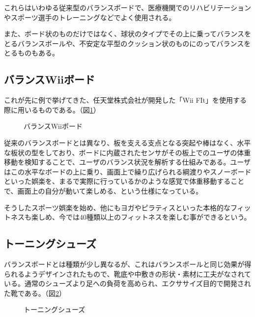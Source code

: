 これらはいわゆる従来型のバランスボードで、医療機関でのリハビリテーションやスポーツ選手のトレーニングなどでよく使用される。

また、ボード状のものだけではなく、球状のタイプでその上に乗ってバランスをとるバランスボールや、不安定な平型のクッション状のものにのってバランスをとるものもある。


\subsection{バランスWiiボード}

これが先に例で挙げてきた、任天堂株式会社が開発した「Wii FIt」を使用する際に用いるものである。（図\ref{fig:03}）


\begin{figure}[htbp]
    \begin{center}
    \end{center}
    \caption{バランスWiiボード}
    \label{fig:03}
\end{figure}



従来のバランスボードとは異なり、板を支える支点となる突起や棒はなく、水平な板状の型をしており、ボードに内蔵されたセンサがその板上でのユーザの体重移動を検知することで、ユーザのバランス状況を解析する仕組みである。ユーザはこの水平なボードの上に乗り、画面上で繰り広げられる綱渡りやスノーボードといった娯楽を、まるで実際に行っているかのような感覚で体重移動することで、画面上の自分が動いて楽しめる、という仕様になっている。

そうしたスポーツ娯楽を始め、他にもヨガやピラティスといった本格的なフィットネスも楽しめ、今では40種類以上のフィットネスを楽しむ事ができるという。 \cite{hoge04}



\subsection{トーニングシューズ}

バランスボードとは種類が少し異なるが、これはバランスボールと同じ効果が得られるようデザインされたもので、靴底や中敷きの形状・素材に工夫がなされている。通常のシューズより足への負荷を高められ、エクササイズ目的で開発された靴である。（図\ref{fig:04}）


\begin{figure}[htbp]
    \begin{center}
    \end{center}
    \caption{トーニングシューズ}
    \label{fig:04}
\end{figure}


